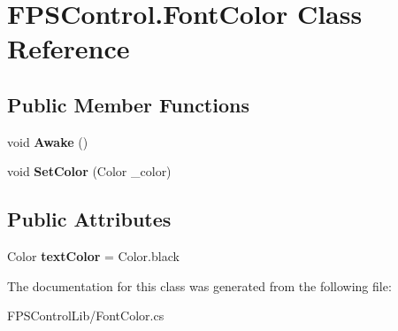 \hypertarget{class_f_p_s_control_1_1_font_color}{\section{F\-P\-S\-Control.\-Font\-Color Class Reference}
\label{class_f_p_s_control_1_1_font_color}
}
\subsection*{Public Member Functions}
\begin{DoxyCompactItemize}
\item 
\hypertarget{class_f_p_s_control_1_1_font_color_a3a43a37409dd4b59442f6073a0e427fb}{void {\bfseries Awake} ()}\label{class_f_p_s_control_1_1_font_color_a3a43a37409dd4b59442f6073a0e427fb}

\item 
\hypertarget{class_f_p_s_control_1_1_font_color_afe4d86056eb691ab33f43ecfb00a4b7f}{void {\bfseries Set\-Color} (Color \-\_\-color)}\label{class_f_p_s_control_1_1_font_color_afe4d86056eb691ab33f43ecfb00a4b7f}

\end{DoxyCompactItemize}
\subsection*{Public Attributes}
\begin{DoxyCompactItemize}
\item 
\hypertarget{class_f_p_s_control_1_1_font_color_ab01873c9ea398c162ebbd43090094a90}{Color {\bfseries text\-Color} = Color.\-black}\label{class_f_p_s_control_1_1_font_color_ab01873c9ea398c162ebbd43090094a90}

\end{DoxyCompactItemize}


The documentation for this class was generated from the following file\-:\begin{DoxyCompactItemize}
\item 
F\-P\-S\-Control\-Lib/Font\-Color.\-cs\end{DoxyCompactItemize}
